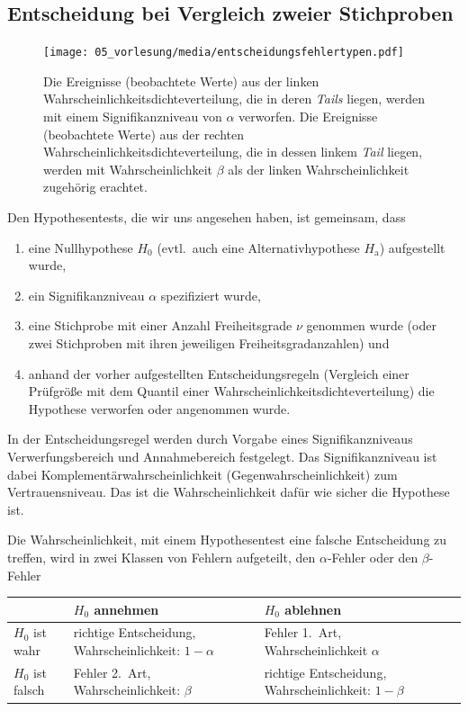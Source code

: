 \subsection{Entscheidung bei Vergleich zweier Stichproben}
\begin{figure}
\begin{center}
\texttt{[image: 05\_vorlesung/media/entscheidungsfehlertypen.pdf]}
\caption{\label{entscheidungsfehler} Die Ereignisse (beobachtete Werte) aus der linken Wahrscheinlichkeitsdichteverteilung,
 die in deren \textsl{Tails} liegen, werden mit einem Signifikanzniveau von $\alpha$ verworfen.
 Die Ereignisse (beobachtete Werte) aus der rechten Wahrscheinlichkeitsdichteverteilung, die in dessen linkem
 \textsl{Tail} liegen, werden mit Wahrscheinlichkeit $\beta$ als der linken Wahrscheinlichkeit zugehörig
 erachtet.}
\end{center}
\end{figure}
Den Hypothesentests, die wir uns angesehen haben, ist gemeinsam, dass
\begin{enumerate}
\item eine Nullhypothese $H_0$ (evtl.\ auch eine Alternativhypothese $H_\mathrm{a}$)
aufgestellt wurde,
\item ein Signifikanzniveau $\alpha$ spezifiziert wurde,
\item eine Stichprobe mit einer Anzahl Freiheitsgrade $\nu$
genommen wurde (oder zwei Stichproben mit ihren jeweiligen Freiheitsgradanzahlen) und
\item anhand der vorher aufgestellten Entscheidungsregeln (Vergleich einer
Prüfgröße mit dem Quantil einer Wahrscheinlichkeitsdichteverteilung)
die Hypothese verworfen oder angenommen wurde.
\end{enumerate}
In der Entscheidungsregel werden durch Vorgabe eines Signifikanzniveaus Verwerfungsbereich
und Annahmebereich festgelegt. Das Signifikanzniveau ist dabei Komplementärwahrscheinlichkeit
(Gegenwahrscheinlichkeit) zum Vertrauensniveau. Das ist die Wahrscheinlichkeit dafür
wie sicher die Hypothese ist.

Die Wahrscheinlichkeit, mit einem Hypothesentest eine falsche
Entscheidung zu treffen, wird in zwei Klassen von Fehlern aufgeteilt, den
$\alpha$-Fehler oder den $\beta$-Fehler

\begin{center}
\begin{tabular}{M{3cm}|M{5.5cm}|M{5.5cm} N}
                 &     $H_0$ annehmen    &     $H_0$ ablehnen   \\[3pt]
\hline
$H_0$ ist wahr   & richtige Entscheidung, Wahrscheinlichkeit: $1-\alpha$ & Fehler 1.\ Art, Wahrscheinlichkeit $\alpha$ \\[3pt]
\hline
$H_0$ ist falsch & Fehler 2.\ Art, Wahrscheinlichkeit: $\beta$  & richtige Entscheidung, Wahrscheinlichkeit: $1-\beta$
\end{tabular}
\end{center}

